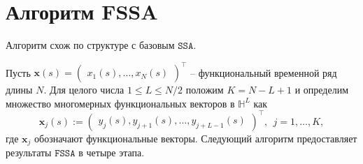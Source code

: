 \documentclass[12pt, specialist, subf
]{disser}
\theoremstyle{definition}
\newcommand{\SSA}{\texttt{SSA}}
\newcommand{\FSSA}{\texttt{FSSA}}
\newcommand{\TS}{\mathsf{X}}
\begin{document}










\section{Алгоритм FSSA}
Алгоритм схож по структуре с базовым $\SSA$.

Пусть ${\pmb x}(s)=\begin{pmatrix} x_1(s),\ldots,x_N(s)\end{pmatrix}^\top$ -- функциональный временной ряд длины $N$.
Для целого числа $1\leq L\leq{N}/{2}$ положим $K=N-L+1$ и определим множество многомерных функциональных векторов в $\mathbb{H}^L$ как
\begin{equation}\label{flvec}
	{\pmb x}_j(s):= \begin{pmatrix} y_j(s), y_{j+1}(s), \ldots, y_{j+L-1}(s)\end{pmatrix}^\top,\ \ j=1,\ldots, K,
\end{equation}
где ${\pmb x}_j$ обозначают функциональные векторы. Следующий алгоритм предоставляет результаты $\FSSA$ в четыре этапа.
\end{document}
